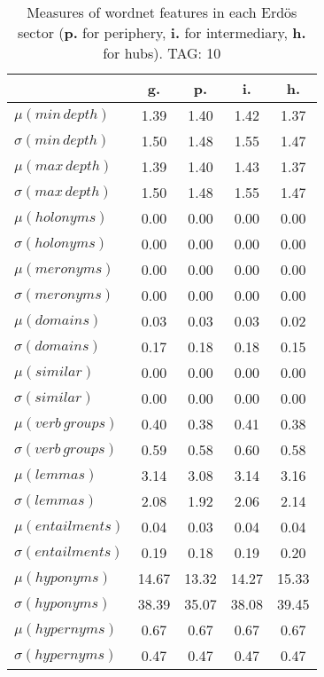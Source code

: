 \begin{table}[h!]
\begin{center}
\begin{tabular}{| l || c | c | c | c |}\hline
 & {\bf g.} & {\bf p.} & {\bf i.} & {\bf h.} \\\hline\hline
$\mu(min\,depth)$ & 1.39  & 1.40  & 1.42  & 1.37 \\
$\sigma(min\,depth)$ & 1.50  & 1.48  & 1.55  & 1.47 \\\hline
$\mu(max\,depth)$ & 1.39  & 1.40  & 1.43  & 1.37 \\
$\sigma(max\,depth)$ & 1.50  & 1.48  & 1.55  & 1.47 \\\hline
$\mu(holonyms)$ & 0.00  & 0.00  & 0.00  & 0.00 \\
$\sigma(holonyms)$ & 0.00  & 0.00  & 0.00  & 0.00 \\\hline
$\mu(meronyms)$ & 0.00  & 0.00  & 0.00  & 0.00 \\
$\sigma(meronyms)$ & 0.00  & 0.00  & 0.00  & 0.00 \\\hline
$\mu(domains)$ & 0.03  & 0.03  & 0.03  & 0.02 \\
$\sigma(domains)$ & 0.17  & 0.18  & 0.18  & 0.15 \\\hline
$\mu(similar)$ & 0.00  & 0.00  & 0.00  & 0.00 \\
$\sigma(similar)$ & 0.00  & 0.00  & 0.00  & 0.00 \\\hline
$\mu(verb\,groups)$ & 0.40  & 0.38  & 0.41  & 0.38 \\
$\sigma(verb\,groups)$ & 0.59  & 0.58  & 0.60  & 0.58 \\\hline
$\mu(lemmas)$ & 3.14  & 3.08  & 3.14  & 3.16 \\
$\sigma(lemmas)$ & 2.08  & 1.92  & 2.06  & 2.14 \\\hline
$\mu(entailments)$ & 0.04  & 0.03  & 0.04  & 0.04 \\
$\sigma(entailments)$ & 0.19  & 0.18  & 0.19  & 0.20 \\\hline
$\mu(hyponyms)$ & 14.67  & 13.32  & 14.27  & 15.33 \\
$\sigma(hyponyms)$ & 38.39  & 35.07  & 38.08  & 39.45 \\\hline
$\mu(hypernyms)$ & 0.67  & 0.67  & 0.67  & 0.67 \\
$\sigma(hypernyms)$ & 0.47  & 0.47  & 0.47  & 0.47 \\\hline
\end{tabular}
\caption{Measures of wordnet features in each Erd\"os sector ({{\bf p.}} for periphery, {{\bf i.}} for intermediary, {{\bf h.}} for hubs). TAG: 10}
\end{center}
\end{table}